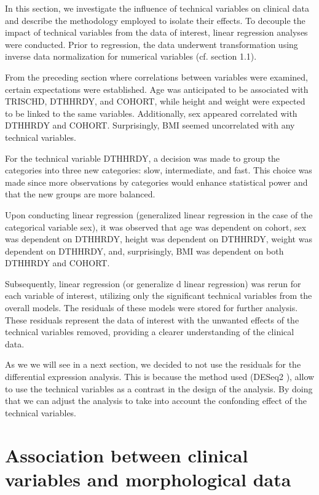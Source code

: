 \documentclass[a4paper, 11pt]{article}
\begin{document}
\begin{multicols}{2}
In this section, we investigate the influence of technical variables on clinical data and describe the methodology employed to isolate their effects.
To decouple the impact of technical variables from the data of interest, linear regression analyses were conducted.
Prior to regression, the data underwent transformation using inverse data normalization for numerical variables (cf. section 1.1).

From the preceding section where correlations between variables were examined, certain expectations were established.
Age was anticipated to be associated with TRISCHD, DTHHRDY, and COHORT, while height and weight were expected to be linked to the same variables.
Additionally, sex appeared correlated with DTHHRDY and COHORT. Surprisingly, BMI seemed uncorrelated with any technical variables.

For the technical variable DTHHRDY, a decision was made to group the categories into three new categories: slow, intermediate, and fast.
This choice was made since more observations by categories would enhance statistical power and that the new groups are more balanced.

Upon conducting linear regression (generalized linear regression in the case of the categorical variable sex), it was observed that age was dependent on cohort, sex was dependent on DTHHRDY, height was dependent on DTHHRDY, weight was dependent on DTHHRDY, and, surprisingly, BMI was dependent on both DTHHRDY and COHORT.

Subsequently, linear regression (or generalize d linear regression) was rerun for each variable of interest, utilizing only the significant technical variables from the overall models.
The residuals of these models were stored for further analysis.
These residuals represent the data of interest with the unwanted effects of the technical variables removed, providing a clearer understanding of the clinical data.

As we we will see in a next section, we decided to not use the residuals for the differential expression analysis. This is because the method used (DESeq2 \citep{DESeq2:2014}), allow to use the technical variables as a contrast in the design of the analysis. By doing that we can adjust the analysis to take into account the confonding effect of the technical variables.

\section{Association between clinical variables and morphological data}


\end{multicols}
\end{document}

